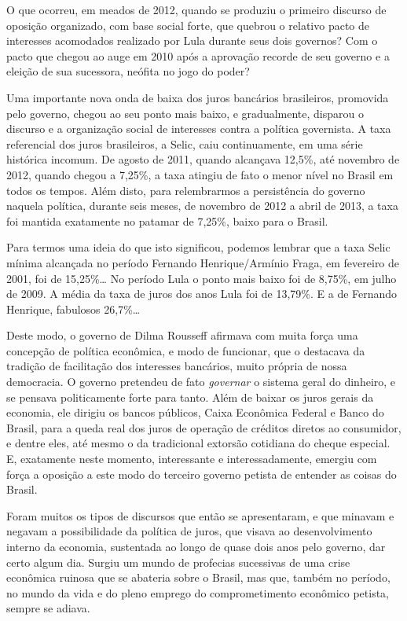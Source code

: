 O que ocorreu, em meados de 2012, quando se produziu o primeiro discurso de
oposição organizado, com base social forte, que quebrou o relativo pacto
de interesses acomodados realizado por Lula durante seus dois governos?
Com o pacto que chegou ao auge em 2010 após a aprovação recorde de seu governo
e a eleição de sua sucessora, neófita no jogo do poder?

Uma importante nova onda de baixa dos juros bancários brasileiros,
promovida pelo governo, chegou ao seu ponto mais baixo, e gradualmente, disparou o
discurso e a organização social de interesses contra a política governista. A
taxa referencial dos juros brasileiros, a Selic, caiu continuamente, em
uma série histórica incomum. De agosto de 2011, quando alcançava 12,5\%,
até novembro de 2012, quando chegou a 7,25\%, a taxa atingiu de fato o
menor nível no Brasil em todos os tempos. Além disto, para relembrarmos
a persistência do governo naquela política, durante seis meses, de
novembro de 2012 a abril de 2013, a taxa foi mantida exatamente no
patamar de 7,25\%, baixo para o Brasil.

Para termos uma ideia do que isto significou, podemos lembrar que a
taxa Selic mínima alcançada no período Fernando Henrique/Armínio Fraga,
em fevereiro de 2001, foi de 15,25\%… No período Lula o ponto mais baixo
foi de 8,75\%, em julho de 2009. A média da taxa de juros dos anos Lula
foi de 13,79\%. E a de Fernando Henrique, fabulosos 26,7\%…

Deste modo, o governo de Dilma Rousseff afirmava com muita força uma
concepção de política econômica, e modo de funcionar, que o destacava da
tradição de facilitação dos interesses bancários, muito própria de nossa
democracia. O governo pretendeu de fato \emph{governar} o sistema geral
do dinheiro, e se pensava politicamente forte para tanto. Além de baixar
os juros gerais da economia, ele dirigiu os bancos públicos, Caixa
Econômica Federal e Banco do Brasil, para a queda real dos juros de
operação de créditos diretos ao consumidor, e dentre eles, até mesmo o
da tradicional extorsão cotidiana do cheque especial. E, exatamente
neste momento, interessante e interessadamente, emergiu com força a
oposição a este modo do terceiro governo petista de entender as coisas
do Brasil.

Foram muitos os tipos de discursos que então se apresentaram, e que
minavam e negavam a possibilidade da política de juros, que visava ao
desenvolvimento interno da economia, sustentada ao longo de quase dois
anos pelo governo, dar certo algum dia. Surgiu um mundo de profecias
sucessivas de uma crise econômica ruinosa que se abateria sobre o
Brasil, mas que, também no período, no mundo da vida e do pleno emprego
do comprometimento econômico petista, sempre se adiava.

